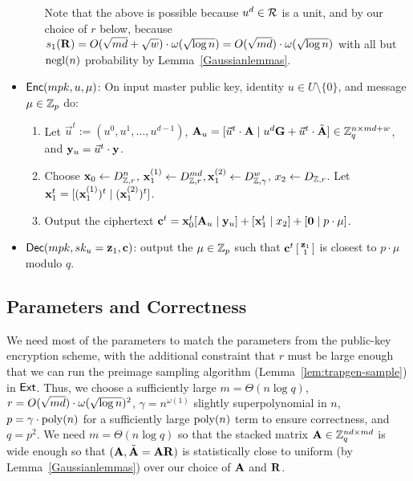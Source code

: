 \begin{itemize}
\begin{enumerate}
    Note that the above is possible because $u^{d} \in \mathcal{R}$ is a
    unit, and by our choice of $r$ below, because $s_{1}(\mathbf{R}) =
    O(\sqrt{md} + \sqrt{w}) \cdot \omega(\sqrt{\log n}) = O(\sqrt{md}) \cdot \omega(\sqrt{\log n})$
    with all but $\operatorname{negl}(n)$ probability by Lemma~\ref{Gaussianlemmas}.
  \end{enumerate}
  
\item $\mathsf{Enc}(mpk, u, \mu)$: On input master public key, identity $u
  \in U \setminus \{0\}$, and message $\mu \in \mathbb{Z}_p$ do:
  \begin{enumerate}
  \item Let $\vec{u}^t := (u^0, u^1, \ldots, u^{d-1})$, $\mathbf{A}_{u} =
    [\vec{u}^t \cdot \mathbf{A} \mid u^d\mathbf{G}+\vec{u}^t\cdot \tilde{\mathbf{A}}] \in
    \mathbb{Z}_q^{n \times md+w}$, and $\mathbf{y}_{u} = \vec{u}^t \cdot \mathbf{y}$.
  \item Choose $\mathbf{x}_0 \gets D_{\mathbb{Z}, r}^{n}$, $\mathbf{x}_1^{(1)} \gets D_{\mathbb{Z},
      r}^{md}, \mathbf{x}_1^{(2)} \gets D_{\mathbb{Z}, \gamma}^{w}$, $x_2 \gets D_{\mathbb{Z},
      r}$. Let $\mathbf{x}_1^t = [(\mathbf{x}_1^{(1)})^t \mid (\mathbf{x}_1^{(2)})^t]$.
  \item Output the ciphertext $\mathbf{c}^t = \mathbf{x}_0^t[\mathbf{A}_{u} \mid
    \mathbf{y}_{u}]+[\mathbf{x}_1^t \mid x_2] + [\mathbf{0} \mid p\cdot \mu]$.
  \end{enumerate}

\item $\mathsf{Dec}(mpk, sk_{u} = \mathbf{z}_{1}, \mathbf{c})$: output the $\mu \in
  \mathbb{Z}_p$ such that $\mathbf{c}^t \left[
    \begin{smallmatrix}
      \mathbf{z}_{1} \\ 1
    \end{smallmatrix} \right]$ is closest to $p \cdot \mu$ modulo $q$.
\end{itemize}

\subsection{Parameters and Correctness}
\label{subsec:IBEparams}

We need most of the parameters to match the parameters from the
public-key encryption scheme, with the additional constraint that $r$
must be large enough that we can run the preimage sampling algorithm
(Lemma~\ref{lem:trapgen-sample}) in $\mathsf{Ext}$.  Thus, we choose a
sufficiently large $m=\Theta(n \log q)$, $r = O(\sqrt{md}) \cdot
\omega(\sqrt{\log n})^{2}$, $\gamma=n^{\omega(1)}$ slightly superpolynomial in $n$,
$p=\gamma \cdot \operatorname{poly}(n)$ for a sufficiently large $\operatorname{poly}(n)$ term to
ensure correctness, and $q=p^2$.  We need $m = \Theta(n \log{q})$ so
that the stacked matrix $\mathbf{A} \in \mathbb{Z}_q^{nd \times md}$ is wide enough
so that $(\mathbf{A}, \tilde{\mathbf{A}}=\mathbf{A}\mathbf{R})$ is statistically close to
uniform (by Lemma~\ref{Gaussianlemmas}) over our choice of $\mathbf{A}$ and
$\mathbf{R}$.

